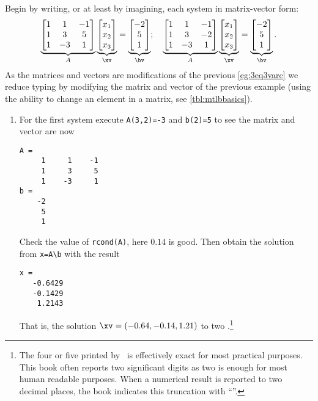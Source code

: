 \begin{example}
\begin{solution} 
Begin by writing, or at least by imagining, each system in matrix-vector form:
\begin{equation*}
\underbrace{\begin{bmatrix} 1&1&-1\\ 1&3&5\\1&-3&1 \end{bmatrix}}_A
\underbrace{\begin{bmatrix} x_1\\x_2\\x_3 \end{bmatrix}}_\xv
=\underbrace{\begin{bmatrix} -2\\5\\1 \end{bmatrix}}_\bv ;
\quad
\underbrace{\begin{bmatrix} 1&1&-1\\ 1&3&-2\\1&-3&1 \end{bmatrix}}_A
\underbrace{\begin{bmatrix} x_1\\x_2\\x_3 \end{bmatrix}}_\xv
=\underbrace{\begin{bmatrix} -2\\5\\1 \end{bmatrix}}_\bv .
\end{equation*}
As the matrices and vectors are modifications of the previous \cref{eg:3eq3varc} we reduce typing by modifying the matrix and vector of the previous example (using the ability to change an element in a matrix, see \cref{tbl:mtlbbasics}).
\begin{enumerate}
\item For the first system execute \verb|A(3,2)=-3| and \verb|b(2)=5|
to see the matrix and vector are now
\begin{verbatim}
A =
     1     1    -1
     1     3     5
     1    -3     1
b =
    -2
     5
     1
\end{verbatim}
Check the value of \verb|rcond(A)|, here \(0.14\) is good.
Then obtain the solution from \verb|x=A\b| with the result
\begin{verbatim}
x =
   -0.6429
   -0.1429
    1.2143
\end{verbatim}
That is, the solution \(\xv=(-0.64,-0.14,1.21)\) to two  \twodp.\footnote{The four or five  printed by \script\ is effectively exact for most practical purposes.
This book often reports two significant digits as two is enough for most human readable purposes.
When a numerical result is reported to two decimal places, the book indicates this truncation with ``\twodp''.}


\end{enumerate}
\end{solution}
\end{example}
